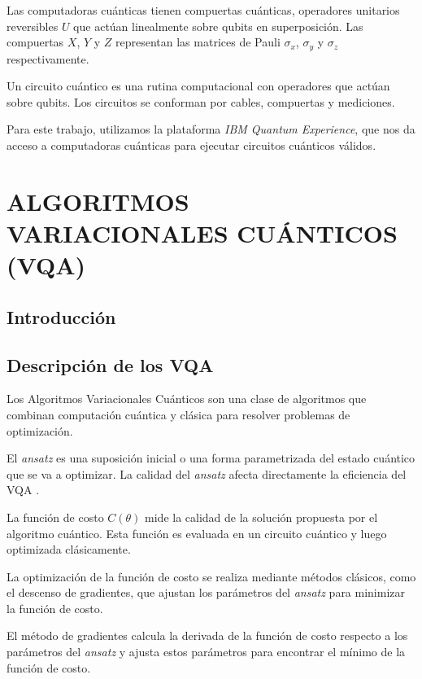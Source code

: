 \documentclass[letterpaper,12pt]{thesisECFM}
\theoremstyle{plain}
\theoremstyle{definition}
\theoremstyle{remark}
\newcommand{\1}{\mathbb{1}}
\begin{document}
Las computadoras cuánticas tienen compuertas cuánticas, operadores unitarios reversibles $U$ que actúan linealmente sobre qubits en superposición. Las compuertas $X$, $Y$ y $Z$ representan las matrices de Pauli $\sigma_x$, $\sigma_y$ y $\sigma_z$ respectivamente. \par 

Un circuito cuántico es una rutina computacional con operadores que actúan sobre qubits. Los circuitos se conforman por cables, compuertas y mediciones. \par 

Para este trabajo, utilizamos la plataforma \textit{IBM Quantum Experience}, que nos da acceso a computadoras cuánticas para ejecutar circuitos cuánticos válidos. \par  
\chapter{ALGORITMOS VARIACIONALES CUÁNTICOS (VQA)} %
\section{Introducción}
\section{Descripción de los VQA}
Los Algoritmos Variacionales Cuánticos son una clase de algoritmos que combinan computación cuántica y clásica para resolver problemas de optimización. \par 

El \textit{ansatz} es una suposición inicial o una forma parametrizada del estado cuántico que se va a optimizar. La calidad del \textit{ansatz} afecta directamente la eficiencia del VQA . \par 

La función de costo $C(\theta)$ mide la calidad de la solución propuesta por el algoritmo cuántico. Esta función es evaluada en un circuito cuántico y luego optimizada clásicamente. \par 

La optimización de la función de costo se realiza mediante métodos clásicos, como el descenso de gradientes, que ajustan los parámetros del \textit{ansatz} para minimizar la función de costo. \par 
 
El método de gradientes calcula la derivada de la función de costo respecto a los parámetros del \textit{ansatz} y ajusta estos parámetros para encontrar el mínimo de la función de costo. \par 
\end{document}
